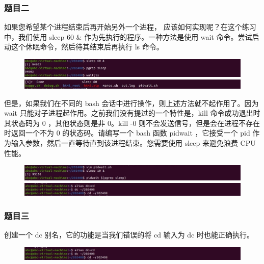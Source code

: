\documentclass[a4paper, 12pt]{article}
\begin{document}
	\subsubsection{题目二}
	如果您希望某个进程结束后再开始另外一个进程， 应该如何实现呢？在这个练习中，我们使用 sleep 60 \& 作为先执行的程序。一种方法是使用 wait 命令。尝试启动这个休眠命令，然后待其结束后再执行 ls 命令。
	
	\begin{figure}[H]
		\centering
		\includegraphics[width=1\textwidth]{002.jpg}
		\includegraphics[width=1\textwidth]{003.jpg}
	\end{figure}
	
	但是，如果我们在不同的 bash 会话中进行操作，则上述方法就不起作用了。因为 wait 只能对子进程起作用。之前我们没有提过的一个特性是，kill 命令成功退出时其状态码为 0 ，其他状态则是非 0。kill -0 则不会发送信号，但是会在进程不存在时返回一个不为 0 的状态码。请编写一个 bash 函数 pidwait ，它接受一个 pid 作为输入参数，然后一直等待直到该进程结束。您需要使用 sleep 来避免浪费 CPU 性能。
	
	\begin{figure}[H]
		\centering
		\includegraphics[width=1\textwidth]{004.jpg}
		\includegraphics[width=1\textwidth]{005.jpg}
	\end{figure}
	
	\subsubsection{题目三}
	创建一个 dc 别名，它的功能是当我们错误的将 cd 输入为 dc 时也能正确执行。
	
	\begin{figure}[H]
		\centering
		\includegraphics[width=1\textwidth]{005.jpg}
	\end{figure}
	
\end{document}
